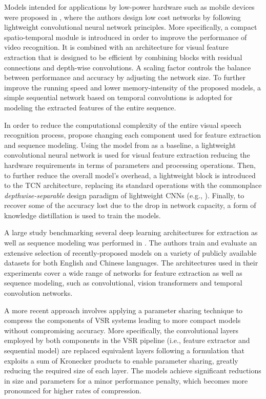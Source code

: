 Models intended for applications by low-power hardware such as mobile devices were proposed in \cite{shrivastava2019mobivsr}, where the authors design low cost networks by following lightweight convolutional neural network principles.
More specifically, a compact spatio-temporal module is introduced in order to improve the performance of video recognition.
It is combined with an architecture for visual feature extraction that is designed to be efficient by combining blocks with residual connections and depth-wise convolutions.
A scaling factor controls the balance between performance and accuracy by adjusting the network size.
To further improve the running speed and lower memory-intensity of the proposed models, a simple sequential network based on temporal convolutions is adopted for modeling the extracted features of the entire sequence.

In order to reduce the computational complexity of the entire visual speech recognition process, \cite{ma2021towards} propose changing each component used for feature extraction and sequence modeling.
Using the model from \cite{martinez2020lipreading} as a baseline, a lightweight convolutional neural network is used for visual feature extraction reducing the hardware requirements in terms of parameters and processing operations.
Then, to further reduce the overall model's overhead, a lightweight block is introduced to the TCN architecture, replacing its standard operations with the commonplace \textit{depthwise-separable} design paradigm of lightweight CNNs (e.g., \cite{chollet2017xception, howard2017mobilenets, zhang2018shufflenet}).
Finally, to recover some of the accuracy lost due to the drop in network capacity, a form of knowledge distillation is used to train the models.

A large study benchmarking several deep learning architectures for extraction as well as sequence modeling was performed in \cite{arakane2023efficient}.
The authors train and evaluate an extensive selection of recently-proposed models on a variety of publicly available datasets for both English and Chinese languages.
The architectures used in their experiments cover a wide range of networks for feature extraction as well as sequence modeling, such as convolutional, vision transformers and temporal convolution networks.

A more recent approach \cite{panagos2022compressing, panagos2024visual} involves applying a parameter sharing technique to compress the components of VSR systems leading to more compact models without compromising accuracy.
More specifically, the convolutional layers employed by both components in the VSR pipeline (i.e., feature extractor and sequential model) are replaced equivalent layers following a formulation that exploits a sum of Kronecker products to enable parameter sharing, greatly reducing the required size of each layer.
The models achieve significant reductions in size and parameters for a minor performance penalty, which becomes more pronounced for higher rates of compression.